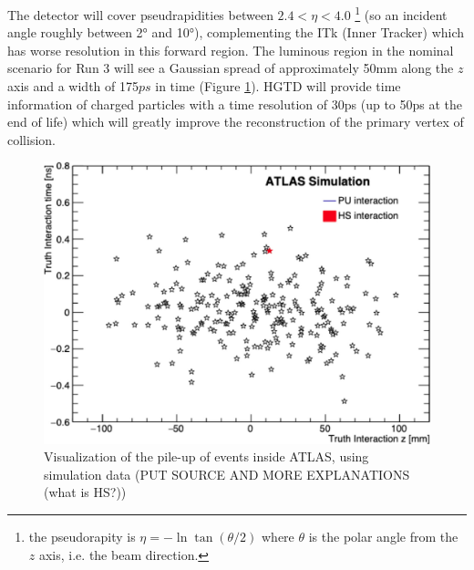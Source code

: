 The detector will cover pseudrapidities between $2.4 < \eta < 4.0$ \footnote{the pseudorapity is $\eta=-\ln \tan(\theta/2)$ where $\theta$ is the polar angle from the $z$ axis, i.e. the beam direction.} (so an incident angle roughly between 2° and 10°), complementing the ITk (Inner Tracker) which has worse resolution in this forward region. The luminous region in the nominal scenario for Run 3 will see a Gaussian spread of approximately 50mm along the $z$ axis and a width of 175$\si{ps}$ in time (Figure \ref{fig:events_pileup}). HGTD will provide time information of charged particles with a time resolution of 30ps (up to 50ps at the end of life) which will greatly improve the reconstruction of the primary vertex of collision.


\begin{figure}[!hb]
    \centering
    \includegraphics[width=.8\textwidth]{Images/intro/events_pileup_HL_LHC.jpg}
    \caption{Visualization of the pile-up of events inside ATLAS, using simulation data (PUT SOURCE AND MORE EXPLANATIONS (what is HS?))}
    \label{fig:events_pileup}
\end{figure}
